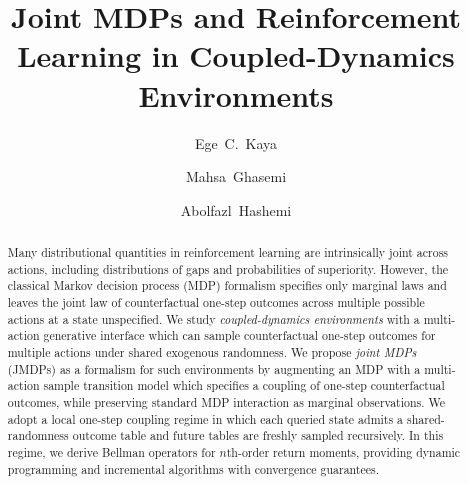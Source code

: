 \documentclass[accepted]{uai2026}
\title{Joint MDPs and Reinforcement Learning in Coupled-Dynamics Environments}
\author[1]{Ege~C.~Kaya}
\author[1]{Mahsa~Ghasemi}
\author[1]{Abolfazl~Hashemi}
\affil[1]{
    Elmore Family School of Electrical and Computer Engineering\\
    Purdue University\\
    West Lafayette, IN, USA
}
\theoremstyle{plain}
\theoremstyle{definition}
\theoremstyle{remark}
\newcommand{\1}{\mathbbm{1}}
\begin{document}
\maketitle

\begin{abstract}
Many distributional quantities in reinforcement learning are intrinsically joint across actions, including distributions of gaps and probabilities of superiority. However, the classical Markov decision process (MDP) formalism specifies only marginal laws and leaves the joint law of counterfactual one-step outcomes across multiple possible actions at a state unspecified. We study \textit{coupled-dynamics environments} with a multi-action generative interface which can sample counterfactual one-step outcomes for multiple actions under shared exogenous randomness. We propose \textit{joint MDPs} (JMDPs) as a formalism for such environments by augmenting an MDP with a multi-action sample transition model which specifies a coupling of one-step counterfactual outcomes, while preserving standard MDP interaction as marginal observations. 
We adopt a local one-step coupling regime in which each queried state admits a shared-randomness outcome table and future tables are freshly sampled recursively. In this regime, we derive Bellman operators for $n$th-order return moments, providing dynamic programming and incremental algorithms with convergence guarantees.
\end{abstract}
\end{document}
